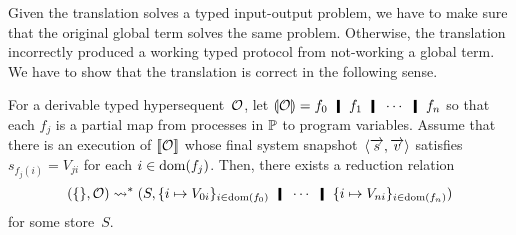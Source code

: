  Given the translation solves a typed input-output problem, we have to
 make sure that the original global term solves the same problem.
 Otherwise, the translation incorrectly produced a working typed protocol from
 not-working a global term.
 We have to show that the translation is correct in the following sense.
  \begin{proposition}
   \label{general-sound}
   For a derivable typed hypersequent~$\mathcal{O}$, let $\semoi{\hypert} =
   f_0\hmid
   f_1\hmid\cdots \hmid f_n$ so that each $f_j$ is a partial map
   from processes in $\mathbb{P}$ to program variables.
   Assume that there is an execution of $\llbracket{\mathcal{O}}\rrbracket$ whose
   final system snapshot~$\langle{\overrightarrow s,\overrightarrow v}\rangle$ satisfies
   $s_{f_j(i)} = V_{ji}$ for each $i \in \mathop{\mathrm{dom}}(f_j)$.
   Then, there exists a reduction relation
   \[
   \concreteconf{\{\}}{\hypert}\reduction
   \concreteconf{S}{
   \{i\mapsto V_{0i}\}_{i\in\dom(f_0)}\hmid
   \cdots\hmid
   \{i\mapsto V_{ni}\}_{i\in\dom(f_n)}
   }
   \]
   for some store~$S$.
  \end{proposition}

